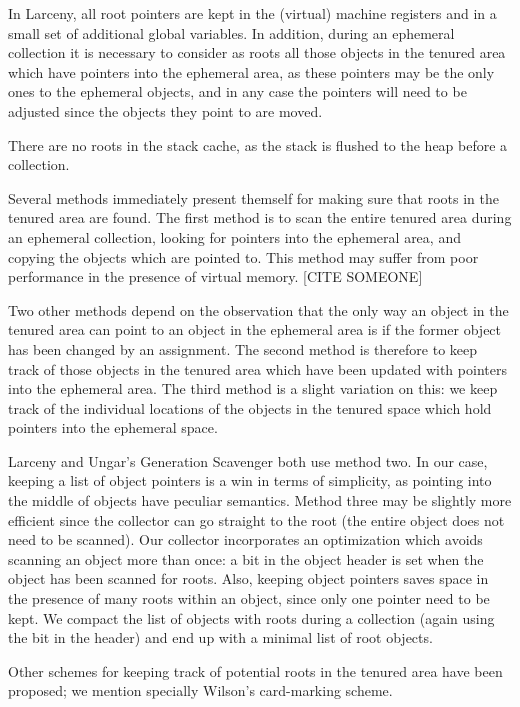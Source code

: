 In Larceny, all root pointers are kept in the (virtual) machine registers and
in a small set of additional global variables. In addition, during an ephemeral
collection it is necessary to consider as roots all those objects in the
tenured area which have pointers into the ephemeral area, as these pointers
may be the only ones to the ephemeral objects, and in any case the pointers
will need to be adjusted since the objects they point to are moved.

There are no roots in the stack cache, as the stack is flushed to the heap
before a collection.

Several methods immediately present themself for making sure that roots
in the tenured area are
found. The first method is to scan the entire tenured area during an
ephemeral collection, looking for pointers into the ephemeral area, and
copying the objects which are pointed to. This method may suffer from poor
performance in the presence of virtual memory. [CITE SOMEONE]

Two other methods depend on the observation that the only way an object
in the tenured area can point to an object in the ephemeral area is if the
former object has been changed by an assignment. The second method is 
therefore to keep track of those objects in the tenured area which have been
updated with pointers into the ephemeral area. The third method is a slight
variation on this: we keep track of the individual locations of the objects
in the tenured space which hold pointers into the ephemeral space.

Larceny and Ungar's Generation Scavenger both use method two. In our case,
keeping a list of object pointers is a win in terms of simplicity, as
pointing into the middle of objects have peculiar semantics. Method three
may be slightly more efficient since the collector can go straight to the
root (the entire object does not need to be scanned). Our collector 
incorporates an optimization which avoids scanning an object more than once:
a bit in the object header is set when the object has been scanned for
roots. Also, keeping object pointers saves space in the presence of many
roots within an object, since only one pointer need to be kept. We compact
the list of objects with roots during a collection (again using the bit in
the header) and end up with a minimal list of root objects.

Other schemes for keeping track of potential roots in the tenured area have
been proposed; we mention specially Wilson's card-marking scheme.
\cite{Wilson:card-marking}

